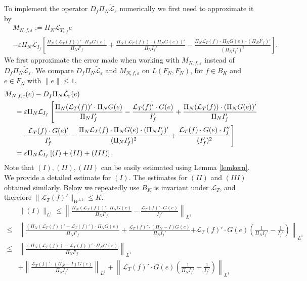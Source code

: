 \documentclass[12pt]{article}
\def\L{\mathcal{L}}
\newcommand{\eps}{\varepsilon}
\theoremstyle{plain}
\begin{document}
{{To implement the operator $D_f\Pi_N\tilde{\mathcal L}_\eps$  numerically we first need to approximate it by 
\begin{align*}
    &M_{N,f,\eps}:= \Pi_N\L_{T_{\eps,f}}e\\
    &-\eps \Pi_N\L_{I_f}\left[\frac{\Pi_N(\L_{T}(f))'\cdot \Pi_N G(e)}{\Pi_N I'_f} + \frac{\Pi_N(\L_{T}(f))\cdot (\Pi_NG(e))'}{\Pi_N I_{f}'} - \frac{\Pi_N\L_{T}(f)\cdot \Pi_NG(e)\cdot (\Pi_N I'_f)'}{(\Pi_N I_{f}')^2}\right].\nonumber
\end{align*}
We first approximate the error made when working with $M_{N,f,\eps}$ instead of $D_f\Pi_N\tilde{\mathcal L}_\eps$.
We compare $D_f\Pi_N\tilde{\mathcal L}_\eps$ and $M_{N,f,\eps}$ on $L(F_N,F_N)$, for $f\in B_K$ and $e\in F_N$ with $\|e\|\leq 1$.
\begin{align*}
    &M_{N,f,\eps}(e)-D_f\Pi_N\tilde{\mathcal L}_\eps(e)\\
    &\hskip 0.5cm=\eps \Pi_N\L_{I_f}\left[\frac{\Pi_N(\L_{T}(f))'\cdot \Pi_N  G(e)}{\Pi_N I'_f}-\frac{\L_{T}(f)'\cdot G(e)}{I_{f}'} + \frac{\Pi_N(\L_{T}(f))\cdot (\Pi_NG(e))'}{\Pi_N I_{f}'}\right.\\
    &\hskip 0.75cm\left. - \frac{\L_{T}(f)\cdot G(e)'}{I_{f}'} -  \frac{\Pi_N\L_{T}(f)\cdot \Pi_NG(e)\cdot (\Pi_N I'_f)'}{(\Pi_N I_{f}')^2}+\frac{\L_{T}(f)\cdot G(e)\cdot I''_f}{(I_{f}')^2}\right]\\
    &\hskip 0.5cm=\eps \Pi_N\L_{I_f}\left[ (I)+(II)+(III) \right].
\end{align*}
Note that $(I), (II), (III)$ can be easily estimated using Lemma \ref{lemkern}. We provide a detailed estimate for $(I)$. The estimates for $(II)$ and $(III)$ obtained similarly. Below we repeatedly use $B_K$ is invariant under $\L_T$, and therefore $\|\L_T(f)'\|_{W^{1,1}}\le K$.
\begin{align*}
  &\|(I)\|_{L^1}\leq  \left\| \frac{\Pi_N(\L_{T}(f))' \cdot \Pi_N G(e)}{\Pi_N I'_f}-\frac{\L_{T}(f)'\cdot G(e)}{I_{f}'}\right\|_{L^1}\\
  \leq & \left\| \frac{(\Pi_N(\L_{T}(f))'-\L_{T}(f)') \cdot \Pi_NG(e)}{\Pi_N I'_f}+\frac{\L_{T}(f)'\cdot (\Pi_N-I)G(e)}{\Pi_NI_{f}'}\right.\left.+\L_{T}(f)'\cdot G(e) \left(\frac{1}{\Pi_NI_{f}'}-\frac{1}{I_{f}'}\right)\right\|_{L^1}\\
  \leq & \left\| \frac{(\Pi_N(\L_{T}(f))-\L_{T}(f))' \cdot \Pi_NG(e)}{\Pi_N I'_f}\right\|_{L^1}\\
  &+\left\|\frac{\L_{T}(f)'\cdot (\Pi_N-I)G(e)}{\Pi_NI_{f}'}\right\|_{L^1}+\left\|\L_{T}(f)'\cdot G(e) \left(\frac{1}{\Pi_NI_{f}'}-\frac{1}{I_{f}'}\right)\right\|_{L^1}\\

\end{align*}}}
\end{document}

